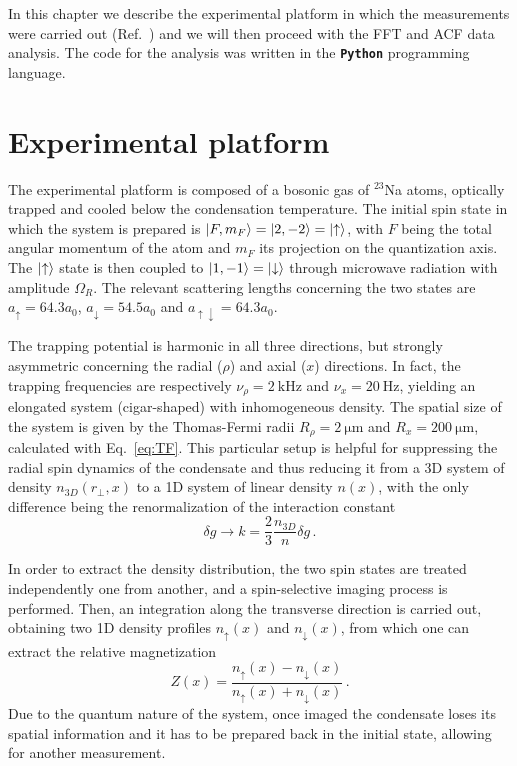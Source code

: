 In this chapter we describe the experimental platform in which the measurements were carried out (Ref.\ \cite{zenesini2024false}) and we will then proceed with the FFT and ACF data analysis. The code for the analysis was written in the \textbf{\texttt{Python}} programming language.

\section{Experimental platform}
The experimental platform is composed of a bosonic gas of $^{23}$Na atoms, optically trapped and cooled below the condensation temperature. The initial spin state in which the system is prepared is $\ket{F, m_F} = \ket{2, -2} = \ket{\uparrow}$, with $F$ being the total angular momentum of the atom 
and $m_F$ its projection on the quantization axis. The $\ket{\uparrow}$ state is then coupled to $\ket{1, -1} = \ket{\downarrow}$ through microwave radiation with amplitude $\Omega_R$. The relevant scattering lengths concerning the two states are $a_\uparrow = 64.3 a_0$, $a_\downarrow = 54.5 a_0$ and $a_{\uparrow\downarrow} = 64.3 a_0$.

The trapping potential is harmonic in all three directions, but strongly asymmetric concerning the radial ($\rho$) and axial ($x$) directions. In fact, the trapping frequencies are respectively $\nu_\rho = 2\ \unit{\kilo\hertz}$ and $\nu_x = 20\ \unit{\hertz}$, yielding an elongated system (cigar-shaped) with inhomogeneous density. The spatial size of the system is given by the Thomas-Fermi radii $R_\rho = 2\ \unit{\micro\meter}$ and $R_x = 200\ \unit{\micro\meter}$, calculated with Eq.\ \eqref{eq:TF}. This particular setup is helpful for suppressing the radial spin dynamics of the condensate and thus reducing it from a 3D system of density $n_{3D}(r_\perp,x)$ to a 1D system of linear density $n(x)$, with the only difference being the renormalization of the interaction constant
\[
    \delta g \to k = \frac{2}{3}\frac{n_{3D}}{n}\delta g\, .
\]

In order to extract the density distribution, the two spin states are treated independently one from another, and a spin-selective imaging process is performed. Then, an integration along the transverse direction is carried out, obtaining two 1D density profiles $n_\uparrow(x)$ and $n_\downarrow(x)$, from which one can extract the relative magnetization
\begin{equation}
    Z(x) = \frac{n_\uparrow(x) - n_\downarrow(x)}{n_\uparrow(x) + n_\downarrow(x)}\, .
    \label{eq:magnetization}
\end{equation}
Due to the quantum nature of the system, once imaged the condensate loses its spatial information and it has to be prepared back in the initial state, allowing for another measurement.

